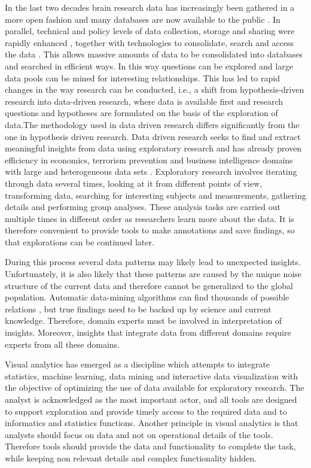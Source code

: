 \documentclass[twocolumn]{svjour3}
\begin{document}
In the last two decades brain research data has increasingly been gathered in a more open fashion and many databases are now available to the public \cite{milham_open_2012}. In parallel, technical and policy levels of data collection, storage and sharing were rapidly enhanced \cite{eckersley_neuroscience_2003}, together with technologies to consolidate, search and access the data \cite{van_horn_is_2009}\cite{wood_harnessing_2014}. 
This allows massive amounts of data to be consolidated into databases and searched in efficient ways.  In this way questions can be explored and large data pools can be mined for interesting relationships. This has led to rapid changes in the way research can be conducted, i.e., a shift from hypothesis-driven research into data-driven research, where data is available first and research questions and hypotheses are formulated on the basis of the exploration of data.The methodology used in data driven research differs significantly from the one in hypothesis driven research. Data driven research seeks to find and extract meaningful insights from data using exploratory research \cite{tukey_we_1980} and has already proven efficiency in economics, terrorism prevention and business intelligence domains with large and heterogeneous data sets \cite{cook_illuminating_2005}. Exploratory research involves iterating through data several times, looking at it from different points of view, transforming data, searching for interesting subjects and measurements, gathering details and performing group analyses. These analysis tasks are carried out multiple times in different order as researchers learn more about the data. It is therefore convenient to provide tools to make annotations and save findings, so that explorations can be continued later.

During this process several data patterns may likely lead to unexpected insights. Unfortunately, it is also likely that these patterns are caused by the unique noise structure of the current data and therefore cannot be generalized to the global population. Automatic data-mining algorithms can find thousands of possible relations , but true findings need to be backed up by science and current knowledge.  Therefore, domain experts must be involved in interpretation of insights. Moreover, insights that integrate data from different domains require experts from all these domains.

Visual analytics \cite{keim_visual_2008} has emerged as a discipline which attempts to integrate statistics, machine learning, data mining and interactive data visualization with the objective of optimizing the use of data available for exploratory research. The analyst is acknowledged as the most important actor, and all tools are designed to support exploration and provide timely access to the required data and to informatics and statistics functions. Another principle in visual analytics is that analysts should focus on data and not on operational details of the tools. Therefore tools should provide the data and functionality to complete the task, while keeping non relevant details and complex functionality hidden. 
					
\end{document}
